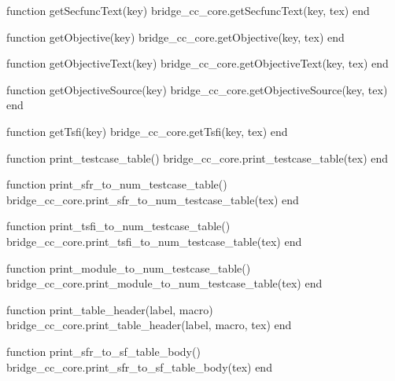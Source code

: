 \begin{luacode}
  function getSecfuncText(key)
    bridge_cc_core.getSecfuncText(key, tex)
  end

  function getObjective(key)
    bridge_cc_core.getObjective(key, tex)
  end

  function getObjectiveText(key)
    bridge_cc_core.getObjectiveText(key, tex)
  end

  function getObjectiveSource(key)
    bridge_cc_core.getObjectiveSource(key, tex)
  end

  function getTsfi(key)
    bridge_cc_core.getTsfi(key, tex)
  end

  function print_testcase_table()
    bridge_cc_core.print_testcase_table(tex)
  end

  function print_sfr_to_num_testcase_table()
    bridge_cc_core.print_sfr_to_num_testcase_table(tex)
  end

  function print_tsfi_to_num_testcase_table()
    bridge_cc_core.print_tsfi_to_num_testcase_table(tex)
  end

  function print_module_to_num_testcase_table()
    bridge_cc_core.print_module_to_num_testcase_table(tex)
  end

  function print_table_header(label, macro)
    bridge_cc_core.print_table_header(label, macro, tex)
  end

  function print_sfr_to_sf_table_body()
    bridge_cc_core.print_sfr_to_sf_table_body(tex)
  end

\end{luacode}
